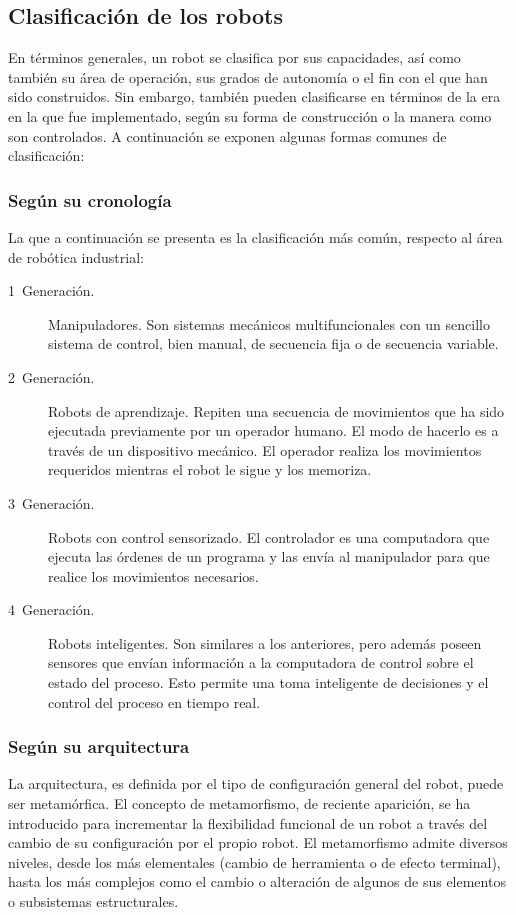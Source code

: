 \subsection{Clasificación de los robots}

En términos generales, un robot se clasifica por sus capacidades, así como también su área de operación, sus grados de autonomía o el fin con el que han sido construidos. Sin embargo, también pueden clasificarse en términos de la era en la que fue implementado, según su forma de construcción o la manera como son controlados. A continuación se exponen algunas formas comunes de clasificación:

\subsubsection{Según su cronología}
La que a continuación se presenta es la clasificación más común, respecto al área de robótica industrial:

\begin{description}
\item[1\textordfeminine\ Generación.]
Manipuladores. Son sistemas mecánicos multifuncionales con un sencillo sistema de control, bien manual, de secuencia fija o de secuencia variable.

\item[2\textordfeminine\ Generación.]
Robots de aprendizaje. Repiten una secuencia de movimientos que ha sido ejecutada previamente por un operador humano. El modo de hacerlo es a través de un dispositivo mecánico. El operador realiza los movimientos requeridos mientras el robot le sigue y los memoriza.

\item[3\textordfeminine\ Generación.]
Robots con control sensorizado. El controlador es una computadora que ejecuta las órdenes de un programa y las envía al manipulador para que realice los movimientos necesarios.

\item[4\textordfeminine\ Generación.]
Robots inteligentes. Son similares a los anteriores, pero además poseen sensores que envían información a la computadora de control sobre el estado del proceso. Esto permite una toma inteligente de decisiones y el control del proceso en tiempo real.
\end{description}

\subsubsection{Según su arquitectura}
La arquitectura, es definida por el tipo de configuración general del robot, puede ser metamórfica. El concepto de metamorfismo, de reciente aparición, se ha introducido para incrementar la flexibilidad funcional de un robot a través del cambio de su configuración por el propio robot.
El metamorfismo admite diversos niveles, desde los más elementales (cambio de herramienta o de efecto terminal), hasta los más complejos como el cambio o alteración de algunos de sus elementos o subsistemas estructurales.

